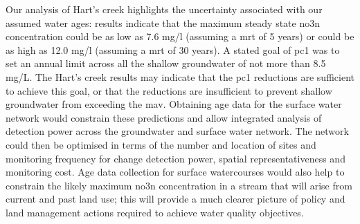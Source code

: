 Our analysis of Hart's creek highlights the uncertainty associated with our assumed water ages: results indicate that the maximum steady state \gls{no3n} concentration could be as low as 7.6 mg/l (assuming a \gls{mrt} of 5 years) or could be as high as 12.0 mg/l (assuming a \gls{mrt} of 30 years).
A stated goal of \gls{pc1} was to set an annual limit across all the shallow groundwater of not more than 8.5 mg/L.
The Hart's creek results may indicate that the \gls{pc1} reductions are sufficient to achieve this goal, or that the reductions are insufficient to prevent shallow groundwater from exceeding the \gls{mav}.
Obtaining age data for the surface water network would constrain these predictions and allow integrated analysis of detection power across the groundwater and surface water network.
The network could then be optimised in terms of the number and location of sites and monitoring frequency for change detection power, spatial representativeness and monitoring cost.
Age data collection for surface watercourses would also help to constrain the likely maximum \gls{no3n} concentration in a stream that will arise from current and past land use; this will provide a much clearer picture of policy and land management actions required to achieve water quality objectives.

